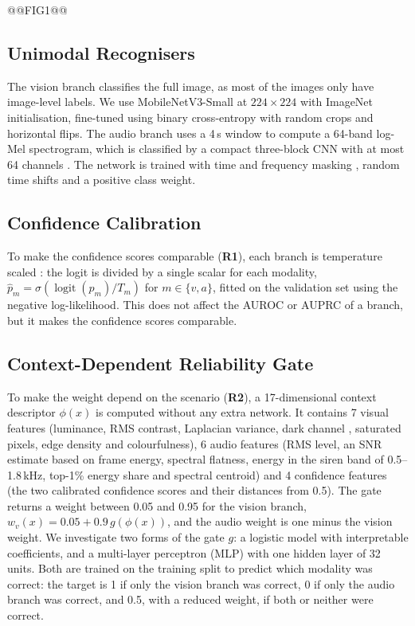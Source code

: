 \documentclass[runningheads,a4paper]{llncs}
\begin{document}
@@FIG1@@

\subsection{Unimodal Recognisers}

The vision branch classifies the full image, as most of the images only have
image-level labels. We use MobileNetV3-Small \cite{howard2019} at
$224\times224$ with ImageNet initialisation, fine-tuned using binary
cross-entropy with random crops and horizontal flips. The audio branch uses a
4\,s window to compute a 64-band log-Mel spectrogram, which is classified by a
compact three-block CNN with at most 64 channels \cite{salamon2017}. The
network is trained with time and frequency masking \cite{park2019}, random
time shifts and a positive class weight.

\subsection{Confidence Calibration}
\label{sec:calib}

To make the confidence scores comparable (\textbf{R1}), each branch is
temperature scaled \cite{guo2017}: the logit is divided by a single scalar for
each modality, $\hat{p}_m = \sigma(\operatorname{logit}(p_m)/T_m)$ for
$m \in \{v, a\}$, fitted on the validation set using the negative
log-likelihood. This does not affect the AUROC or AUPRC of a branch, but it makes the
confidence scores comparable.

\subsection{Context-Dependent Reliability Gate}
\label{sec:gate}

To make the weight depend on the scenario (\textbf{R2}), a 17-dimensional
context descriptor $\phi(x)$ is computed without any extra network. It
contains 7 visual features (luminance, RMS contrast, Laplacian variance, dark
channel \cite{he2011}, saturated pixels, edge density and colourfulness), 6
audio features (RMS level, an SNR estimate based on frame energy, spectral
flatness, energy in the siren band of 0.5--1.8\,kHz, top-1\% energy share and
spectral centroid) and 4 confidence features (the two calibrated confidence
scores and their distances from 0.5). The gate returns a weight between 0.05
and 0.95 for the vision branch, $w_v(x)=0.05+0.9\,g(\phi(x))$, and the audio
weight is one minus the vision weight. We investigate two forms of the gate
$g$: a
logistic model with interpretable coefficients, and a multi-layer perceptron
(MLP) with one hidden layer of 32 units. Both are trained on the training
split to predict which modality was correct: the target is 1 if only the
vision branch was correct, 0 if only the audio branch was correct, and 0.5,
with a reduced weight, if both or neither were correct.
\end{document}
